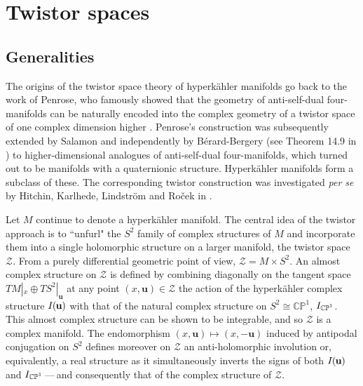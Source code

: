 \documentclass[11pt]{amsart}
\theoremstyle{remark}
\theoremstyle{remark}
\theoremstyle{definition}
\theoremstyle{definition}
\theoremstyle{definition}
\newcommand{\IU}{I\nhp(\nhp\mathbf{u}\hspace{-0.2pt})} %
\newcommand{\0}{{\scriptstyle 0'}} %
\newcommand{\1}{{\scriptstyle 1'}}
\newcommand{\nhp}{\hspace{-0.5pt}} %
\begin{document}
\section{Twistor spaces} \label{sec:Tw-sp}



\subsection{Generalities} \hfill \medskip

The origins of the twistor space theory of hyperk\"ahler manifolds go back to the work of Penrose, who famously showed that the geometry of anti-self-dual four-manifolds can be naturally encoded into the complex geometry of a twistor space of one complex dimension higher \cite{MR0439004}. Penrose's construction was subsequently extended by Salamon \cite{MR0439004,MR860810} and independently by B\'erard-Bergery (see Theorem 14.9 in \cite{MR867684}) to higher-dimensional analogues of anti-self-dual four-manifolds, which turned out to be manifolds with a quaternionic structure. Hyperk\"ahler manifolds form a subclass of these. The corresponding twistor construction was investigated \textit{per se} by Hitchin, Karlhede, Lindstr\"om and Ro\v{c}ek in \cite{MR877637}. 

Let $M$ continue to denote a hyperk\"ahler manifold. The central idea of the twistor approach is to ``unfurl" the $S^2$ family of complex structures of $M$ and incorporate them into a single holomorphic structure on a larger manifold, the twistor space $\mathcal{Z}$. From a purely differential geometric point of view, $\mathcal{Z} = M \times S^2$. An almost complex structure on $\mathcal{Z}$ is defined by combining diagonally on the tangent space $TM |_x \oplus TS^2 |_{\mathbf{u}}$ at any  point $(x,\mathbf{u}) \in \mathcal{Z}$ the action of the hyperk\"ahler complex structure $\IU$ with that of the natural complex structure on $S^2 \cong \mathbb{CP}^1$, $I_{\smash{\mathbb{CP}^1}}$. This almost complex structure can be shown to be integrable, and so $\mathcal{Z}$ is a complex manifold. The endomorphism $(x,\mathbf{u}) \mapsto (x,-\mathbf{u})$ induced by antipodal conjugation on $S^2$ defines moreover on $\mathcal{Z}$ an anti-holomorphic involution or, equivalently, a real structure as it simultaneously inverts the signs of both $\IU$ and $I_{\smash{\mathbb{CP}^1}}$\,---\,and consequently that of the complex structure of $\mathcal{Z}$.  
\end{document}
